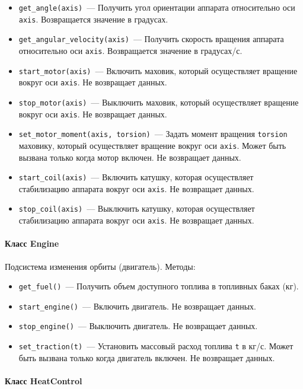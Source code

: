 \documentclass[12pt,a4paper]{article}
\begin{document}
\begin{itemize}
\item \verb'get_angle(axis)'~--- Получить угол ориентации аппарата относительно оси
  \verb'axis'. Возвращается значение в градусах.
\item \verb'get_angular_velocity(axis)'~--- Получить скорость вращения аппарата
  относительно оси \verb'axis'. Возвращается значение в градусах/с.
\item \verb'start_motor(axis)'~--- Включить маховик, который осуществляет вращение вокруг
  оси \verb'axis'. Не возвращает данных.
\item \verb'stop_motor(axis)'~--- Выключить маховик, который осуществляет вращение вокруг
  оси \verb'axis'. Не возвращает данных.
\item \verb'set_motor_moment(axis, torsion)'~--- Задать момент вращения \verb'torsion'
  маховику, который осуществляет вращение вокруг оси \verb'axis'. Может быть вызвана только когда
  мотор включен. Не возвращает данных.
\item \verb'start_coil(axis)'~--- Включить катушку, которая осуществляет стабилизацию
  аппарата вокруг оси \verb'axis'. Не возвращает данных.
\item \verb'stop_coil(axis)'~--- Выключить катушку, которая осуществляет стабилизацию
  аппарата вокруг оси \verb'axis'. Не возвращает данных.
\end{itemize}

\paragraph{Класс Engine}

Подсистема изменения орбиты (двигатель). Методы:

\begin{itemize}
\item \verb'get_fuel()'~--- Получить объем доступного топлива в топливных баках (кг).
\item \verb'start_engine()'~--- Включить двигатель. Не возвращает данных.
\item \verb'stop_engine()'~--- Выключить двигатель. Не возвращает данных.
\item \verb'set_traction(t)'~--- Установить массовый расход топлива \verb't' в кг/с. Может
  быть вызвана только когда двигатель включен. Не возвращает данных.
\end{itemize}

\paragraph{Класс HeatControl}
\end{document}
